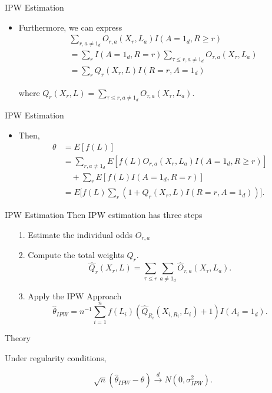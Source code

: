 \documentclass{beamer} %
\begin{document}
\begin{frame}{IPW Estimation}
  \begin{itemize}
    \item Furthermore, we can express
      \begin{align*}
        &\sum_{r, a \neq 1_d} O_{r,a}(X_r, L_a)I(A = 1_d, R \geq r) \\
        &= \sum_{r} I(A = 1_d, R = r) \sum_{\tau \leq r, a \neq 1_d}O_{\tau,a}(X_\tau, L_a) \\
        &= \sum_{r} Q_r(X_r, L) I(R = r, A = 1_d)
      \end{align*}

      where $Q_r(X_r, L) = \sum_{\tau \leq r, a \neq 1_d} O_{\tau,a}(X_\tau, L_a)$.
  \end{itemize}
\end{frame}

\begin{frame}{IPW Estimation}
  \begin{itemize}
    \item Then,
      \begin{align*}
        \theta 
        &= E[f(L)] \\ 
        &= \sum_{r, a\neq 1_d} E[f(L)O_{r,a}(X_r, L_a) I(A = 1_d, R \geq r)] \\
        &\quad+ \sum_{r} E[f(L)I(A = 1_d, R = r)] \\ 
        &= E\Big[f(L)\sum_{r} (1 + Q_r(X_r, L)I(R = r, A = 1_d))\Big].
      \end{align*}
  \end{itemize}
\end{frame}

\begin{frame}{IPW Estimation}
  Then IPW estimation has three steps
  \begin{itemize}
    \item[1.] Estimate the individual odds $O_{r,a}$
    \item[2.] Compute the total weights $Q_r$.
      \[\hat Q_r(X_r, L) = \sum_{\tau \leq r} \sum_{a \neq 1_d}\hat O_{\tau, a}(X_\tau, L_a).\]
    \item[3.] Apply the IPW Approach
      \[\hat \theta_{IPW} = n^{-1} \sum_{i = 1}^n f(L_i)(\hat Q_{R_i}(X_{i,
        R_i}, L_i) + 1)I(A_i = 1_d).\]
  \end{itemize}
\end{frame}

\begin{frame}{Theory}
  \begin{theorem}
    Under regularity conditions,

    \[\sqrt n (\hat \theta_{IPW} - \theta) \stackrel{d}{\to} N(0, \sigma_{IPW}^2).\]
  \end{theorem}
\end{frame}
\end{document}

